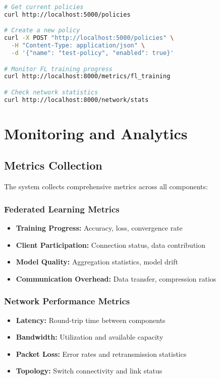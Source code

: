 \documentclass[12pt,a4paper,twoside]{article}
\begin{document}
\begin{lstlisting}[language=bash, caption=API Examples]
# Get current policies
curl http://localhost:5000/policies

# Create a new policy
curl -X POST "http://localhost:5000/policies" \
  -H "Content-Type: application/json" \
  -d '{"name": "test-policy", "enabled": true}'

# Monitor FL training progress
curl http://localhost:8000/metrics/fl_training

# Check network statistics
curl http://localhost:8000/network/stats
\end{lstlisting}

\section{Monitoring and Analytics}

\subsection{Metrics Collection}

The system collects comprehensive metrics across all components:

\subsubsection{Federated Learning Metrics}

\begin{itemize}
    \item \textbf{Training Progress:} Accuracy, loss, convergence rate
    \item \textbf{Client Participation:} Connection status, data contribution
    \item \textbf{Model Quality:} Aggregation statistics, model drift
    \item \textbf{Communication Overhead:} Data transfer, compression ratios
\end{itemize}

\subsubsection{Network Performance Metrics}

\begin{itemize}
    \item \textbf{Latency:} Round-trip time between components
    \item \textbf{Bandwidth:} Utilization and available capacity
    \item \textbf{Packet Loss:} Error rates and retransmission statistics
    \item \textbf{Topology:} Switch connectivity and link status
\end{itemize}
\end{document}
